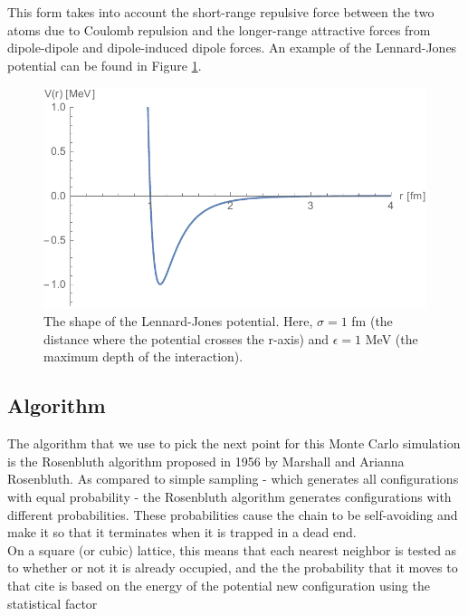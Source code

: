 \documentclass{article}
\begin{document}
\begin{multicols}{2}
This form takes into account the short-range repulsive force between the two atoms due to Coulomb repulsion and the longer-range attractive forces from dipole-dipole and dipole-induced dipole forces.  An example of the Lennard-Jones potential can be found in Figure \ref{VLJfig}.

\begin{figure}[H]
\begin{center}
\includegraphics[width=\linewidth]{Figures/VLJ.pdf}
\caption{The shape of the Lennard-Jones potential.  Here, $\sigma=1$ fm (the distance where the potential crosses the r-axis) and $\epsilon =1$ MeV (the maximum depth of the interaction).}
\label{VLJfig}
\end{center}
\end{figure}

\subsection{Algorithm}

The algorithm that we use to pick the next point for this Monte Carlo simulation is the Rosenbluth algorithm proposed in 1956 by Marshall and Arianna Rosenbluth.  As compared to simple sampling - which generates all configurations with equal probability - the Rosenbluth algorithm generates configurations with different probabilities.  These probabilities cause the chain to be self-avoiding and make it so that it terminates when it is trapped in a dead end.  \cite{SSRosenbluth} \\

On a square (or cubic) lattice, this means that each nearest neighbor is tested as to whether or not it is already occupied, and the the probability that it moves to that cite is based on the energy of the potential new configuration using the statistical factor


\end{multicols}
\end{document}
